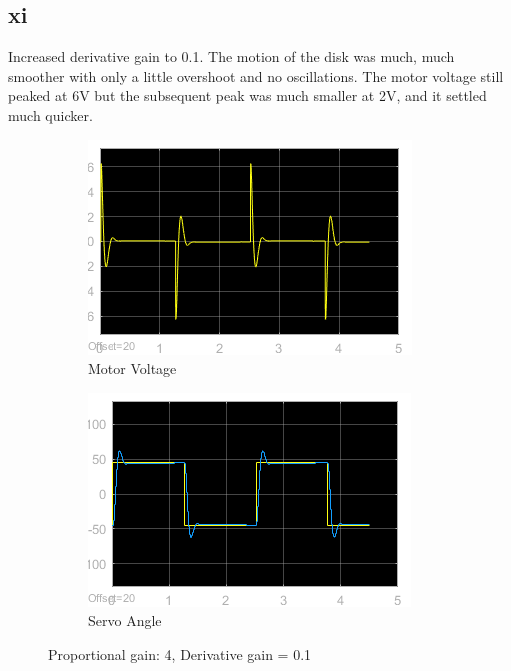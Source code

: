 \documentclass[12pt]{article}
\begin{document}
\subsection*{xi} %
Increased derivative gain to 0.1. The motion of the disk was much, much smoother with only a little overshoot and no oscillations. The motor voltage still peaked at 6V but the subsequent peak was much smaller at 2V, and it settled much quicker.
\begin{figure}[h!]
    \centering
    \begin{subfigure}[b]{0.49\textwidth}
        \includegraphics[width=\textwidth]{xi_voltage}
        \caption{Motor Voltage}
    \end{subfigure}
    \begin{subfigure}[b]{0.49\textwidth}
        \includegraphics[width=\textwidth]{xi_angle}
        \caption{Servo Angle}        
    \end{subfigure}
    \caption{\label{fig:xi} Proportional gain: 4, Derivative gain = 0.1}
\end{figure}
\end{document}
